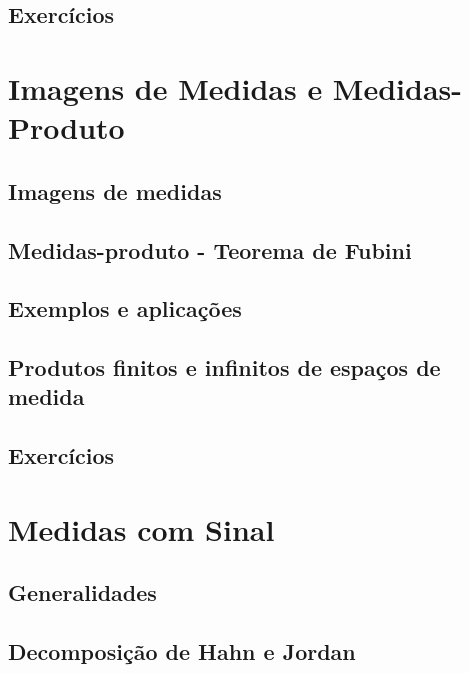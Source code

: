 \documentclass[
]{book}
\begin{document}
\section*{Exercícios}\label{exercuxedcios-4}

\chapter{Imagens de Medidas e Medidas-Produto}\label{imagens-de-medidas-e-medidas-produto}

\section{Imagens de medidas}\label{imagens-de-medidas}

\section{Medidas-produto - Teorema de Fubini}\label{medidas-produto---teorema-de-fubini}

\section{Exemplos e aplicações}\label{exemplos-e-aplicauxe7uxf5es}

\section{Produtos finitos e infinitos de espaços de medida}\label{produtos-finitos-e-infinitos-de-espauxe7os-de-medida}

\section*{Exercícios}\label{exercuxedcios-5}

\chapter{Medidas com Sinal}\label{medidas-com-sinal}

\section{Generalidades}\label{generalidades}

\section{Decomposição de Hahn e Jordan}\label{decomposiuxe7uxe3o-de-hahn-e-jordan}
\end{document}
